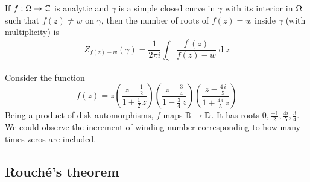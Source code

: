 \documentclass[12pt]{article}
\renewcommand{\d}{\ensuremath{\operatorname{d}}}
\begin{document}
\begin{corollary}
    If $f:\Omega\to\mathbb{C}$ is analytic and $\gamma$ is a simple closed curve in $\gamma$ with its interior in $\Omega$ such that $f(z)\neq w$ on $\gamma$, then the number of roots of $f(z)=w$ inside $\gamma$ (with multiplicity) is $$Z_{f(z)-w}(\gamma)=\frac{1}{2\pi i}\int_{\gamma}\frac{f^{\prime}(z)}{f(z)-w}\d z$$
\end{corollary}

\eg Consider the function \[f(z)=z\left(\frac{z+\frac{1}{2}}{1+\frac{1}{2}\,z}\right)\left(\frac{z-\frac{3}{4}}{1-\frac{3}{4}\,z}\right)\left(\frac{z-\frac{4\,i}{5}}{1+\frac{4\,i}{5}\,z}\right)\] Being a product of disk automorphisms, $f$ maps $\mathbb{D}\to\mathbb{D}$. It has roots $0,\frac{-1}{2}, \frac{4i}{5}, \frac{3}{4}$. We could observe the increment of winding number corresponding to how many times zeros are included.

\subsection{Rouch\'e's theorem}
\end{document}
